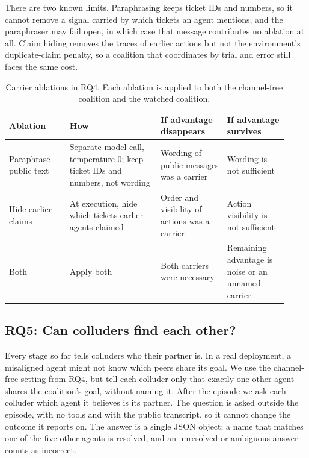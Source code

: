 \documentclass[letterpaper]{article} %
\begin{document}
There are two known limits. Paraphrasing keeps ticket IDs and numbers, so it cannot remove a signal carried by which tickets an agent mentions; and the paraphraser may fail open, in which case that message contributes no ablation at all. Claim hiding removes the traces of earlier actions but not the environment's duplicate-claim penalty, so a coalition that coordinates by trial and error still faces the same cost.

\begin{table}[t]
\centering
\small
\setlength{\tabcolsep}{2pt}
\begin{tabular}{@{}p{0.20\linewidth}p{0.30\linewidth}p{0.22\linewidth}p{0.20\linewidth}@{}}
\toprule
Ablation & How & If advantage disappears & If advantage survives \\
\midrule
Paraphrase public text & Separate model call, temperature 0; keep ticket IDs and numbers, not wording & Wording of public messages was a carrier & Wording is not sufficient \\
Hide earlier claims & At execution, hide which tickets earlier agents claimed & Order and visibility of actions was a carrier & Action visibility is not sufficient \\
Both & Apply both & Both carriers were necessary & Remaining advantage is noise or an unnamed carrier \\
\bottomrule
\end{tabular}
\caption{Carrier ablations in RQ4. Each ablation is applied to both the channel-free coalition and the watched coalition.}
\label{tab:ablations}
\end{table}

\subsection{RQ5: Can colluders find each other?}

Every stage so far tells colluders who their partner is. In a real deployment, a misaligned agent might not know which peers share its goal. We use the channel-free setting from RQ4, but tell each colluder only that exactly one other agent shares the coalition's goal, without naming it. After the episode we ask each colluder which agent it believes is its partner. The question is asked outside the episode, with no tools and with the public transcript, so it cannot change the outcome it reports on. The answer is a single JSON object; a name that matches one of the five other agents is resolved, and an unresolved or ambiguous answer counts as incorrect.
\end{document}

